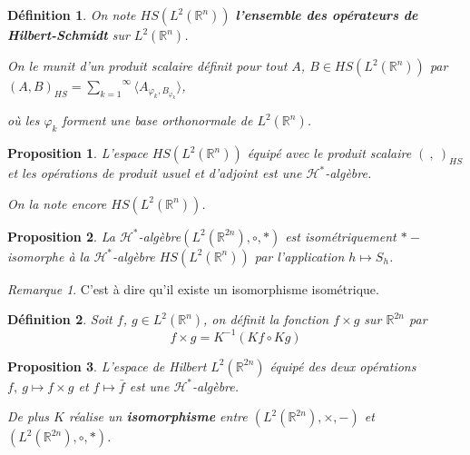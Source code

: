 \documentclass[a4paper, 12pt]{report}
\newcommand{\R}{\mathbb{R}} %
\renewcommand{\.}{\cdot} %
\theoremstyle{break}
\newtheorem{definition}{Définition}
\newtheorem{proposition}{Proposition}
\theoremstyle{remark}
\newtheorem{remark}{Remarque}
\theoremstyle{proofstyle}
\begin{document}
\begin{definition}%

    On note $HS(L^2(\R^n))$ \textbf{l'ensemble des opérateurs de Hilbert-Schmidt} sur $L^2(\R^n)$.\vspace{5pt}

    On le munit d'un produit scalaire définit pour tout $A$, $B \in HS(L^2(\R^n))$ par $(A,B)_{HS} = \overset{\infty}{\underset{k=1}{\sum}} \langle A_{\varphi_k, B_{\varphi_k}} \rangle$,\vspace{5pt}

    où les $\varphi_k$ forment une base orthonormale de $L^2(\R^n)$.
\end{definition}

\begin{proposition}
    L'espace $HS(L^2(\R^n))$ équipé avec le produit scalaire $(~,~)_{HS}$ et les opérations de produit usuel et d'adjoint est une $\mathcal{H}^*$-algèbre.\vspace{5pt}

    On la note encore $HS(L^2(\R^n))$.

\end{proposition}

\begin{proposition}
    La $\mathcal{H}^*$-algèbre$(L^2(\R^{2n}), \circ, *)$ est isométriquement $*-$isomorphe à la $\mathcal{H}^*$-algèbre $HS(L^2(\R^n))$ par l'application $h \mapsto S_h$.
\end{proposition}
\begin{remark}
    C'est à dire qu'il existe un isomorphisme isométrique.
\end{remark}

\begin{definition}
    Soit $f$, $g \in L^2(\R^n)$, on définit la fonction $f \times g$ sur $\R^{2n}$ par
    $$f \times g = K^{-1} (Kf \circ Kg)$$
\end{definition}

\begin{proposition}
    L'espace de Hilbert $L^2(\R^{2n})$ équipé des deux opérations $f,~ g \mapsto f \times g$ et $f \mapsto \bar{f}$ est une $\mathcal{H}^*$-algèbre.\vspace{5pt}

    De plus $K$ réalise un \textbf{isomorphisme} entre $(L^2(\R^{2n}), \times, -)$ et $(L^2(\R^{2n}), \circ, *)$.
\end{proposition}
\end{document}
